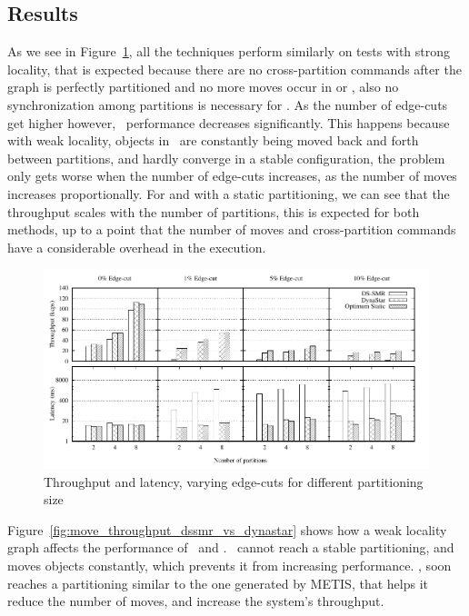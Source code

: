\subsection{Results}
\label{sec:evaluation:results}
As we see in Figure~\ref{fig:varying_edge_cut}, all the techniques perform similarly on tests with strong locality, that is
expected because there are no cross-partition commands after the graph is perfectly partitioned and no more moves 
occur in \dynastar or \dssmr, also no synchronization among partitions is necessary for \ssmr.
As the number of edge-cuts get higher however, \dssmr\ performance decreases significantly.
This happens because with weak locality, objects in \dssmr\ are constantly being moved back and forth between partitions,
and hardly converge in a stable configuration, the problem only gets worse when the number of edge-cuts increases, as
the number of moves increases proportionally.
For \dynastar and \ssmr with a static partitioning, we can see that the throughput scales 
with the number of partitions, this is expected for both methods, up to a point that the number of moves and cross-partition
commands have a considerable overhead in the execution.

\begin{figure}[ht]
	\includegraphics{figures/experiments/throughput-latency-avg-all}
	\caption{Throughput and latency, varying edge-cuts for different partitioning size}
	\label{fig:varying_edge_cut}
\end{figure}

Figure~\ref{fig:move_throughput_dssmr_vs_dynastar} shows how a weak locality graph affects the 
performance of \dssmr\ and \dynastar. \dssmr\ cannot reach a stable partitioning, and moves objects constantly, which
prevents it from increasing performance. \dynastar, soon reaches a partitioning similar to the one
generated by METIS, that helps it reduce the number of moves, and increase the system's throughput.


